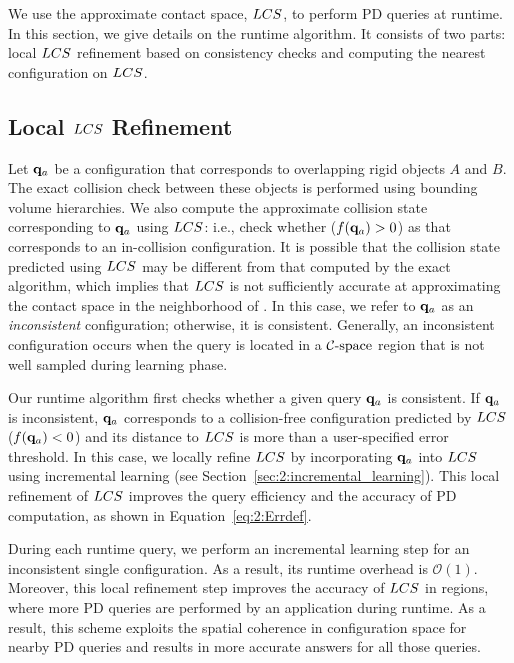 We use the approximate contact space, $LCS$, to perform PD queries at
runtime. In this section, we give details on the runtime
algorithm. It consists of two parts: local $LCS$ refinement based on consistency checks and
computing the nearest configuration on $LCS$.


\subsection{Local $LCS$ Refinement}
Let $\mathbf q_a$ be a configuration that corresponds to overlapping rigid objects $A$
and $B$. The exact collision check  between these objects is performed using
bounding volume hierarchies. We also compute the approximate collision state corresponding to $\mathbf q_a$ using $LCS$: i.e.,
check whether ($f(\mathbf q_a)>0$) as that corresponds to an in-collision configuration.
It is possible that the collision state predicted
using $LCS$ may be different from that computed by the  exact
algorithm, which implies that $LCS$ is not sufficiently
accurate at approximating the contact space in the neighborhood of \qa.
In this case, we refer to $\mathbf q_a$ as an \emph{inconsistent} configuration;
otherwise, it is consistent.
Generally, an inconsistent configuration occurs when the query is located in
a $\mathcal C\text{-space}$ region that is not well sampled during learning phase.

Our runtime algorithm first checks
whether a given query $\mathbf q_a$ is consistent. If $\mathbf q_a$ is inconsistent, $\mathbf q_a$ corresponds to a collision-free configuration
predicted by $LCS$ ($f(\mathbf q_a)<0$) and its distance to $LCS$ is
more than a user-specified error threshold. In this case, we locally refine
$LCS$ by incorporating $\mathbf q_a$ into $LCS$ using incremental learning (see
Section~\ref{sec:2:incremental_learning}).
This local refinement of $LCS$ improves the query efficiency and the accuracy of PD computation, as shown in Equation~\ref{eq:2:Errdef}.

During each runtime query, we perform an incremental learning step for an inconsistent
single configuration. As a result, its runtime overhead is $\mathcal O(1)$.
Moreover, this local refinement step improves the accuracy of $LCS$ in
regions, where more PD queries are performed by an application during runtime. As a result, this scheme
exploits the spatial coherence in configuration space for nearby PD queries
and results in more accurate answers for all those queries.



